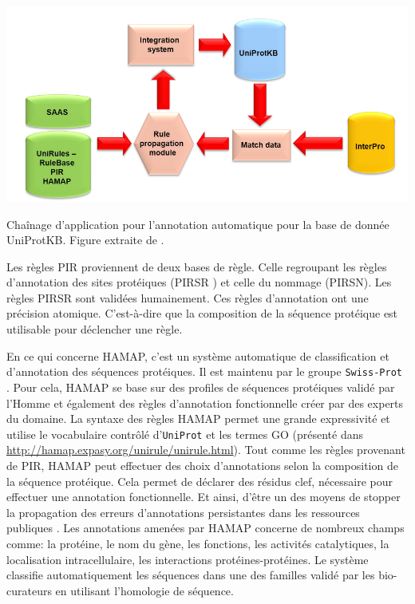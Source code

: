 \begin{refsegment}
    \begin{shadedfigure}[H]
        \centering
        \includegraphics[width=\textwidth]{img/unirule.png}
        \caption{ Chaînage d'application pour l'annotation automatique pour la base de donnée UniProtKB. Figure extraite de . }
        \label{fig:unirule}
    \end{shadedfigure}

    Les règles \acrshort{PIR} proviennent de deux bases de règle.  Celle regroupant les règles d'annotation des sites protéiques (\acrfull{PIRSR} \cite{vasudevan2011structure}) et celle du nommage (\acrfull{PIRSN}). Les règles \acrfull{PIRSR} sont validées humainement. Ces règles d'annotation ont une précision atomique. C'est-à-dire que la composition de la séquence protéique est utilisable pour déclencher une règle.
    
    En ce qui concerne \acrfull{HAMAP}, c'est un système automatique de classification et d'annotation des séquences protéiques. Il est maintenu par le groupe \texttt{Swiss-Prot} . Pour cela, \acrfull{HAMAP} se base sur des profiles de séquences protéiques validé par l'Homme et également des règles d'annotation fonctionnelle créer par des experts du domaine. La syntaxe des règles  \acrfull{HAMAP} permet une grande expressivité et utilise le vocabulaire contrôlé d'\texttt{UniProt} et les termes \acrfull{GO} (présenté dans \url{http://hamap.expasy.org/unirule/unirule.html}). Tout comme les règles provenant de \acrfull{PIR}, \acrfull{HAMAP} peut effectuer des choix d'annotations selon la composition de la séquence protéique. Cela permet de déclarer des résidus clef, nécessaire pour effectuer une annotation fonctionnelle. Et ainsi, d'être un des moyens de stopper la propagation des erreurs d'annotations persistantes dans les ressources publiques \cite{schnoes2009annotation,devos2001intrinsic,bell2013can,gilks2002modeling}. Les annotations amenées par \acrfull{HAMAP} concerne de nombreux champs comme: la protéine, le nom du gène, les fonctions, les activités catalytiques, la localisation intracellulaire, les interactions protéines-protéines. Le système classifie automatiquement les séquences dans une des familles validé par les bio-curateurs en utilisant l'homologie de séquence.
    

\end{refsegment}
